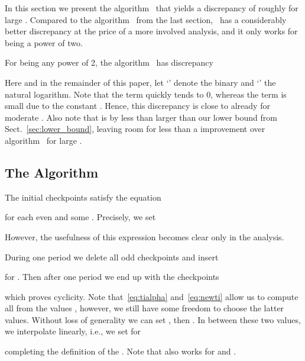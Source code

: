 In this section we present the algorithm \AlgJakub\ that yields a discrepancy of roughly  for large . Compared to the algorithm \AlgKarl\ from the last section, \AlgJakub\ has a considerably better discrepancy at the price of a more involved analysis, and it only works for  being a power of two. 

\begin{theorem} \label{thm:algjacub}
  For  being any power of 2, the algorithm \AlgJakub\ has discrepancy
\LV{
}\SV{}
\end{theorem}
Here and in the remainder of this paper, let `' denote the binary and `' the natural logarithm. Note that the term  quickly tends to 0, whereas the  term is small due to the constant . Hence, this discrepancy is close to  already for moderate . Also note that  is by less than  larger than our lower bound from Sect.~\ref{sec:lower_bound}, leaving room for less than a  improvement over algorithm \AlgJakub\ for large . 

\subsection{The Algorithm \AlgJakub} 

The initial checkpoints  satisfy the equation

for each even  and some . Precisely, we set

However, the usefulness of this expression becomes clear only in the analysis.

During one period we delete all odd checkpoints  and insert

for . Then after one period we end up with the checkpoints

which proves cyclicity. Note that~\eqref{eq:tialpha} and~\eqref{eq:newti} allow us to compute all  from the values , however, we still have some freedom to choose the latter values. Without loss of generality we can set , then . In between these two values, we interpolate  linearly, i.e., we set for 

completing the definition of the . Note that\SV{\eqref{eq:tiinterpol}} also works for  and .

